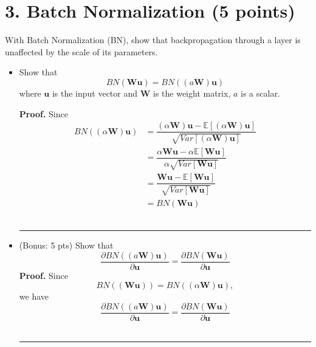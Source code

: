 \documentclass[12pt]{article}%
\newenvironment{proof}[1][Proof]{\textbf{#1.} }{\ \rule{0.5em}{0.5em}}
\begin{document}
\section*{3. Batch Normalization (5 points)}
With Batch Normalization (BN), show that backpropagation through a layer is unaffected by the scale of its parameters. 
\begin{itemize}
	\item Show that \[BN(\mathbf{Wu})=BN((a\mathbf{W})\mathbf{u})\] where $\mathbf{u}$ is the input vector and $\mathbf{W}$ is the weight matrix, $a$ is a scalar. 
	
	\begin{proof}
		Since 
		\begin{align*}
		BN((\alpha \mathbf{W}) \mathbf{u}) &= \dfrac{(\alpha \mathbf{W}) \mathbf{u} - \mathbb{E}[
			(\alpha \mathbf{W}) \mathbf{u}]}{ \sqrt{Var[(\alpha \mathbf{W}) \mathbf{u}]}} \\
		&= \dfrac{\alpha \mathbf{Wu}  - \alpha \mathbb{E}[\mathbf{Wu}]}{\alpha \sqrt{ Var[ \mathbf{Wu} ]}} \\
		&= \dfrac{\mathbf{Wu} - \mathbb{E}[\mathbf{Wu}]}{\sqrt{Var[\mathbf{Wu}]}} \\
		&= BN(\mathbf{Wu})
		\end{align*}
	\end{proof}
	
	
	
	\item (Bonus: 5 pts) Show that 
	\[\frac{\partial BN((a\mathbf{W})\mathbf{u})}{\partial \mathbf{u}}=\frac{\partial BN(\mathbf{W}\mathbf{u})}{\partial \mathbf{u}}\]
	\begin{proof}
		Since $$BN(\mathbf{(Wu)}) = BN((\alpha \mathbf{W})\mathbf{u}),$$
		we have 
		\[\frac{\partial BN((a\mathbf{W})\mathbf{u})}{\partial \mathbf{u}}=\frac{\partial BN(\mathbf{W}\mathbf{u})}{\partial \mathbf{u}}\]
    \end{proof}
\end{itemize}
\newpage



\newpage
\end{document}
